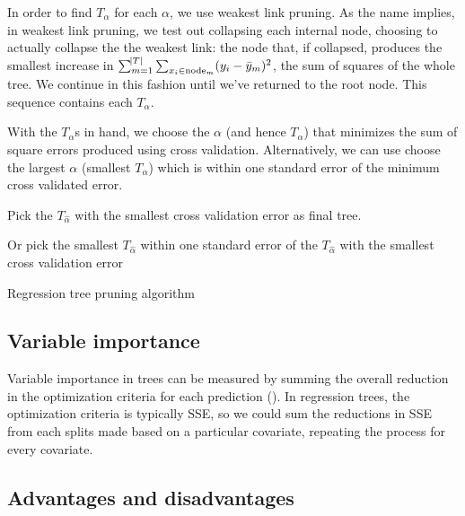 \documentclass[12pt]{article}
\begin{document}
In order to find $T_{\alpha}$ for each $\alpha$, we use weakest link pruning. As the name implies, in weakest link pruning, we test out collapsing each internal node, choosing to actually collapse the the weakest link: the node that, if collapsed, produces the smallest increase in $\sum_{m = 1}^{\abs{T}} \sum_{x_{i} \in \text{node}_{m}} (y_{i} - \bar{y}_{m})^2$, the sum of squares of the whole tree. We continue in this fashion until we've returned to the root node. This sequence contains each $T_{\alpha}$.

With the $T_{\alpha}$s in hand, we choose the $\alpha$ (and hence $T_{\alpha}$) that minimizes the sum of square errors produced using cross validation. Alternatively, we can use choose the largest $\alpha$ (smallest $T_{\alpha}$) which is within one standard error of the minimum cross validated error.

\begin{algorithm}[!htbp]
Pick the $T_{\hat{\alpha}}$ with the smallest cross validation error as final tree.

Or pick the smallest $T_{\hat{\alpha}}$ within one standard error of the $T_{\hat{\alpha}}$ with the smallest cross validation error
 \caption{Regression tree pruning algorithm}
\end{algorithm}



\subsection{Variable importance} %
\label{sub:variable_importance_in_cart}

Variable importance in trees can be measured by summing the overall reduction in the optimization criteria for each prediction (\cite{CART}). In regression trees, the optimization criteria is typically SSE, so we could sum the reductions in SSE from each splits made based on a particular covariate, repeating the process for every covariate.
%


\subsection{Advantages and disadvantages} %
\label{sub:advantages_and_disadvantages_to_cart}
\end{document}
